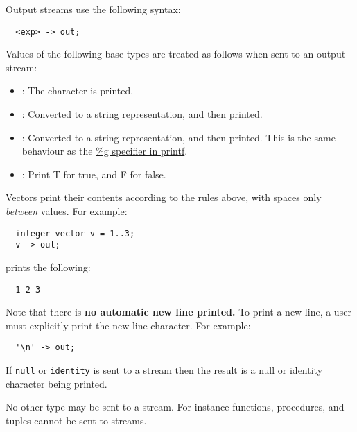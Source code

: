 \documentclass[streams.tex]{subfiles}
\begin{document}
Output streams use the following syntax:
\begin{lstlisting}
  <exp> -> out;
\end{lstlisting}

Values of the following base types are treated as follows when sent to an output stream:
\begin{itemize}
  \item
    : The character is printed.
  \item
    : Converted to a string representation, and then printed.
  \item
    : Converted to a string representation, and then printed. This is the same behaviour
    as the \href{http://www.cplusplus.com/reference/cstdio/printf/	}{\%g specifier in printf}.
  \item
    : Print T for true, and F for false.
\end{itemize}

Vectors print their contents according to the rules above, with spaces only \textit{between} values.
For example:
\begin{lstlisting}
  integer vector v = 1..3;
  v -> out;
\end{lstlisting}

prints the following:
\begin{lstlisting}
  1 2 3
\end{lstlisting}

Note that there is \textbf{no automatic new line printed.} To print a new line, a user must
explicitly print the new line character. For example:
\begin{lstlisting}
  '\n' -> out;
\end{lstlisting}

If \texttt{null} or \texttt{identity} is sent to a stream then the result is a null or identity
character being printed.

No other type may be sent to a stream. For instance functions, procedures, and tuples cannot be sent
to streams.
\end{document}
